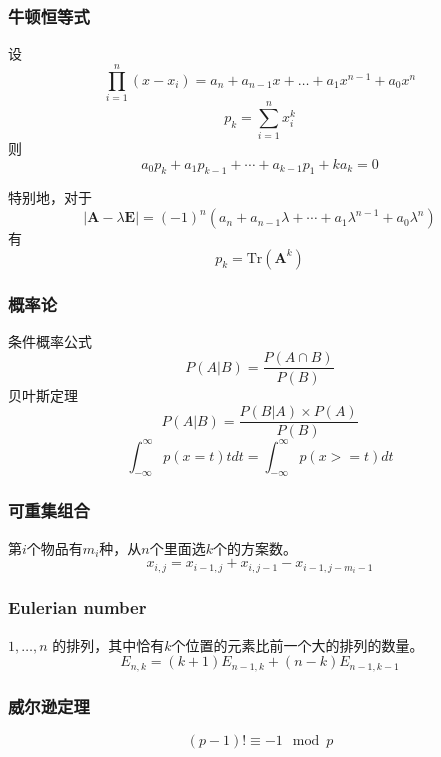 \subsubsection{牛顿恒等式}

设$$\prod_{i = 1}^n{(x - x_i)} = a_n + a_{n - 1} x + \dots + a_1 x^{n - 1} + a_0 x^n$$
$$p_k = \sum_{i = 1}^n{x_i^k}$$
则$$a_0 p_k + a_1 p_{k - 1} + \cdots + a_{k - 1} p_1 + k a_k = 0$$

特别地，对于$$|\mathbf{A} - \lambda \mathbf{E}| = (-1)^n(a_n + a_{n - 1} \lambda + \cdots + a_1 \lambda^{n - 1} + a_0 \lambda^n)$$
有$$p_k = \mathrm{Tr}(\mathbf{A}^k)$$

\subsubsection{概率论}
条件概率公式 $$P(A|B) = \frac{P(A \cap B)}{P(B)}$$
贝叶斯定理 $$P(A|B) = \frac{P(B|A)\times P(A)}{P(B)}$$
$$\int_{-\infty}^{\infty} p(x = t)tdt = \int_{-\infty}^{\infty} p(x >= t) dt$$

\subsubsection{可重集组合}
第$i$个物品有$m_i$种，从$n$个里面选$k$个的方案数。
$$ x_{i,j} = x_{i-1,j} + x_{i,j-1} - x_{i-1,j-m_i-1} $$

\subsubsection{Eulerian number}
$ {1, \ldots ,n} $ 的排列，其中恰有$k$个位置的元素比前一个大的排列的数量。
$$ E_{n,k} = (k+1)E_{n-1,k} + (n-k)E_{n-1,k-1} $$

\subsubsection{威尔逊定理}
$$(p-1)! \equiv -1 \mod p $$
